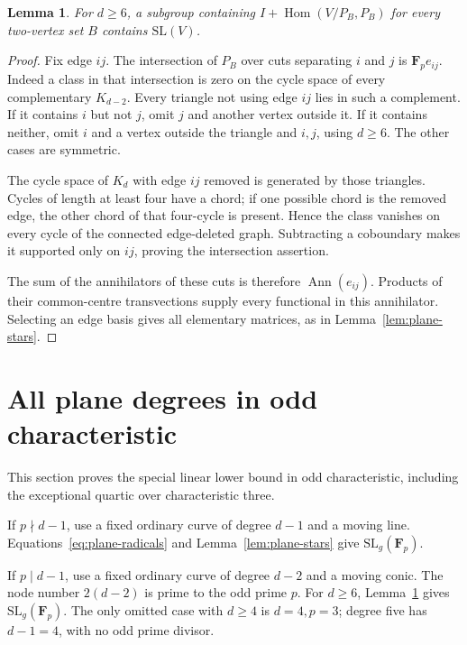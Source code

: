 \documentclass[11pt]{article}
\newtheorem{lemma}[theorem]{Lemma}
\begin{document}
\begin{lemma}\label{lem:plane-cuts}
For $d\ge6$, a subgroup containing $I+\operatorname{Hom}(V/P_B,P_B)$ for every two-vertex set $B$ contains $\mathrm{SL}(V)$.
\end{lemma}
\begin{proof}
Fix edge $ij$. The intersection of $P_B$ over cuts separating $i$ and $j$ is $\mathbf F_p e_{ij}$. Indeed a class in that intersection is zero on the cycle space of every complementary $K_{d-2}$. Every triangle not using edge $ij$ lies in such a complement. If it contains $i$ but not $j$, omit $j$ and another vertex outside it. If it contains neither, omit $i$ and a vertex outside the triangle and $i,j$, using $d\ge6$. The other cases are symmetric.

The cycle space of $K_d$ with edge $ij$ removed is generated by those triangles. Cycles of length at least four have a chord; if one possible chord is the removed edge, the other chord of that four-cycle is present. Hence the class vanishes on every cycle of the connected edge-deleted graph. Subtracting a coboundary makes it supported only on $ij$, proving the intersection assertion.

The sum of the annihilators of these cuts is therefore $\operatorname{Ann}(e_{ij})$. Products of their common-centre transvections supply every functional in this annihilator. Selecting an edge basis gives all elementary matrices, as in Lemma~\ref{lem:plane-stars}.
\end{proof}

\section{All plane degrees in odd characteristic}\label{sec:plane-odd}
This section proves the special linear lower bound in odd characteristic, including the exceptional quartic over characteristic three.

If $p\nmid d-1$, use a fixed ordinary curve of degree $d-1$ and a moving line. Equations~\eqref{eq:plane-radicals} and Lemma~\ref{lem:plane-stars} give $\mathrm{SL}_g(\mathbf F_p)$.

If $p\mid d-1$, use a fixed ordinary curve of degree $d-2$ and a moving conic. The node number $2(d-2)$ is prime to the odd prime $p$. For $d\ge6$, Lemma~\ref{lem:plane-cuts} gives $\mathrm{SL}_g(\mathbf F_p)$. The only omitted case with $d\ge4$ is $d=4,p=3$; degree five has $d-1=4$, with no odd prime divisor.
\end{document}

